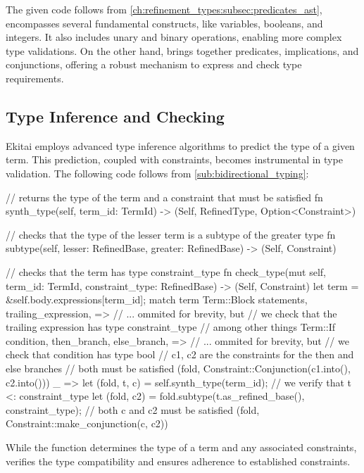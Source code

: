 \documentclass[
  oneside,
  english,
  coorientadorbanca,
  noabntexcite
]{ufsc-thesis-rn46-2019}
\newcommand{\codett}[1]{\text{\scpfamily#1}}
\newcommand{\bnfvar}[1]{\codett{#1}}
\begin{document}
The given code follows from \cref{ch:refinement_types:subsec:predicates_ast}, \bnfvar{Predicate} encompasses several fundamental constructs, like variables, booleans, and integers.
It also includes unary and binary operations, enabling more complex type validations.
On the other hand, \bnfvar{Constraint} brings together predicates, implications, and conjunctions, offering a robust mechanism to express and check type requirements.

\subsection{Type Inference and Checking}

Ekitai employs advanced type inference algorithms to predict the type of a given term. This prediction, coupled with constraints, becomes instrumental in type validation. The following code follows from \autoref{sub:bidirectional_typing}:

\begin{rustcode}
// returns the type of the term and a constraint that must be satisfied
fn synth_type(self, term_id: TermId) -> (Self, RefinedType, Option<Constraint>)

// checks that the type of the lesser term is a subtype of the greater type
fn subtype(self, lesser: RefinedBase, greater: RefinedBase) -> (Self, Constraint)

// checks that the term has type constraint_type
fn check_type(mut self, term_id: TermId, constraint_type: RefinedBase) -> (Self, Constraint) {
  let term = &self.body.expressions[term_id];
  match term {
    Term::Block {
      statements,
      trailing_expression,
    } => {
      // ... ommited for brevity, but
      // we check that the trailing expression has type constraint_type
      // among other things
    }
    Term::If {
      condition,
      then_branch,
      else_branch,
    } => {
      // ... ommited for brevity, but
      // we check that condition has type bool
      // c1, c2 are the constraints for the then and else branches
      // both must be satisfied
      (fold, Constraint::Conjunction(c1.into(), c2.into()))
    }
    _ => {
      let (fold, t, c) = self.synth_type(term_id);
      // we verify that t <: constraint_type
      let (fold, c2) = fold.subtype(t.as_refined_base(), constraint_type);
      // both c and c2 must be satisfied
      (fold, Constraint::make_conjunction(c, c2))
    }
  }
}
\end{rustcode}

While the \codett{synth\_type} function determines the type of a term and any associated constraints, \codett{check\_type} verifies the type compatibility and ensures adherence to established constraints.
\end{document}
